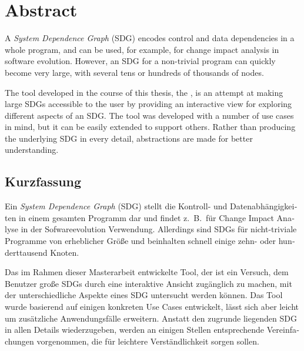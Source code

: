 \chapter*{Abstract} \vspace{-0.5cm}

A \emph{System Dependence Graph} (SDG) encodes control and data dependencies in a whole program, and can be used, for 
example, for change impact analysis in software evolution. However, an SDG for a non-trivial program can quickly become 
very large, with several tens or hundreds of thousands of nodes.

The tool developed in the course of this thesis, the \emph{\SB}, is an attempt at making large SDGs accessible to the 
user by providing an interactive view for exploring different aspects of an SDG. The tool was developed with a number 
of use cases in mind, but it can be easily extended to support others. Rather than producing the underlying SDG in 
every detail, abstractions are made for better understanding.


\begin{otherlanguage}{ngerman}
\begingroup
\let\clearpage\relax
\chapter*{Kurzfassung} \vspace{-0.5cm}
\endgroup

Ein \emph{System Dependence Graph} (SDG) stellt die Kontroll- und Datenabhängigkeiten in einem gesamten Programm dar 
und findet z.\ B.\ für Change Impact Analyse in der Sofwareevolution Verwendung. Allerdings sind SDGs für 
nicht-triviale Programme von erheblicher Größe und beinhalten schnell einige zehn- oder hunderttausend Knoten.

Das im Rahmen dieser Masterarbeit entwickelte Tool, der \emph{\SB} ist ein Versuch, dem Benutzer große SDGs durch eine 
interaktive Ansicht zugänglich zu machen, mit der unterschiedliche Aspekte eines SDG untersucht werden können. Das Tool 
wurde basierend auf einigen konkreten Use Cases entwickelt, lässt sich aber leicht um zusätzliche Anwendungsfälle 
erweitern. Anstatt den zugrunde liegenden SDG in allen Details wiederzugeben, werden an einigen Stellen entsprechende 
Vereinfachungen vorgenommen, die für leichtere Verständlichkeit sorgen sollen.

\end{otherlanguage}
